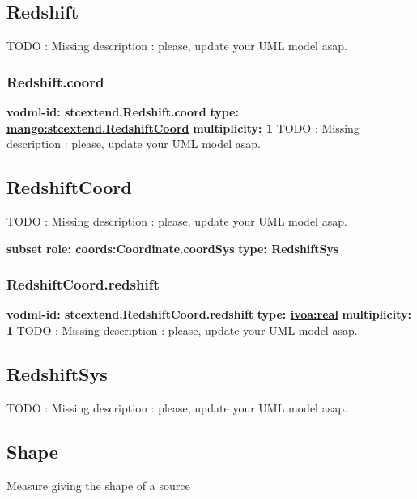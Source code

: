   \subsection{Redshift}
  \label{sect:stcextend.Redshift}
    TODO : Missing description : please, update your UML model asap.

    \subsubsection{Redshift.coord}
      \textbf{vodml-id: stcextend.Redshift.coord} \newline
      \textbf{type: \hyperref[sect:stcextend.RedshiftCoord]{mango:stcextend.RedshiftCoord}} \newline
      \textbf{multiplicity: 1} \newline 
      TODO : Missing description : please, update your UML model asap.

  \subsection{RedshiftCoord}
  \label{sect:stcextend.RedshiftCoord}
    TODO : Missing description : please, update your UML model asap.

    \noindent \textbf{subset} \newline
    \indent   \textbf{role: coords:Coordinate.coordSys} \newline
    \indent   \textbf{type: RedshiftSys} \newline


    \subsubsection{RedshiftCoord.redshift}
      \textbf{vodml-id: stcextend.RedshiftCoord.redshift} \newline
      \textbf{type: \hyperref[sect:ivoa]{ivoa:real}} \newline
      \textbf{multiplicity: 1} \newline 
      TODO : Missing description : please, update your UML model asap.

  \subsection{RedshiftSys}
  \label{sect:stcextend.RedshiftSys}
    TODO : Missing description : please, update your UML model asap.

  \subsection{Shape}
  \label{sect:stcextend.Shape}
    Measure giving the shape of a source

